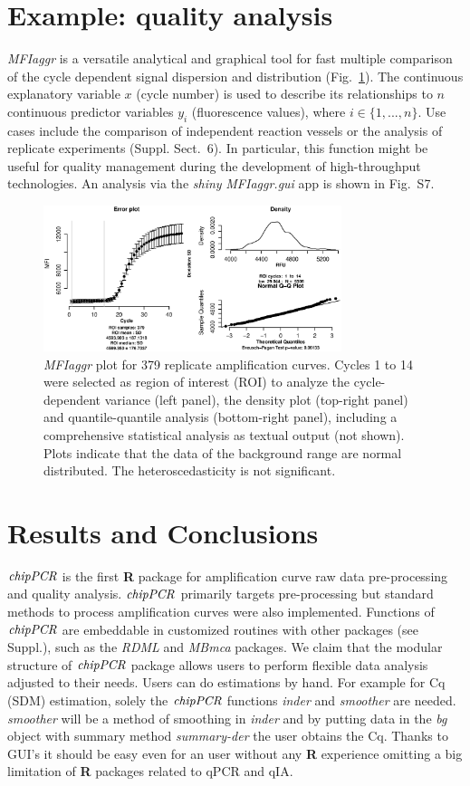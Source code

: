 \documentclass{bioinfo}
\begin{document}
\section{Example: quality analysis}

\textsl{MFIaggr} is a versatile analytical and graphical tool for fast multiple 
comparison of the cycle dependent signal dispersion and distribution 
(Fig.~\ref{fig:01}). The continuous explanatory variable $x$ (cycle number) is 
used to describe its relationships to $n$ continuous predictor variables $y_i$ 
(fluorescence values), where $i \in \{1, ..., n\}$. Use cases include the 
comparison of independent reaction vessels or the analysis of replicate 
experiments (Suppl. Sect.~6). In particular, this function might be useful for 
quality management during the development of high-throughput technologies. An 
analysis via the \emph{shiny} \textsl{MFIaggr.gui} app is shown in Fig.~S7.

\begin{figure}[!tpb]%
\centerline{\includegraphics[width=8.7cm]{fig01.eps}}
\caption{\textsl{MFIaggr} plot for 379 replicate amplification curves. Cycles 1 to 14 were 
selected as region of interest (ROI) to analyze the 
cycle-dependent variance (left panel), the density plot (top-right 
panel) and quantile-quantile analysis (bottom-right panel), including a 
comprehensive statistical analysis as textual output (not shown). Plots 
indicate that the data of the background range are normal 
distributed. The heteroscedasticity is not significant.}\label{fig:01}
\end{figure}
\section{Results and Conclusions}

$\emph{chipPCR}$ is the first \textbf{R} package for amplification curve raw 
data pre-processing and quality analysis. $\emph{chipPCR}$ primarily targets 
pre-processing but standard methods to process amplification curves were also 
implemented. Functions of $\emph{chipPCR}$ are embeddable in customized routines 
with other packages (see Suppl.), such as the \emph{RDML} and \emph{MBmca} 
packages. We claim that the 
modular structure of $\emph{chipPCR}$ package allows users to perform flexible 
data analysis adjusted to their needs. Users can do estimations by hand. For 
example for Cq (SDM) estimation, solely the $\emph{chipPCR}$ functions 
\textsl{inder} and \textsl{smoother} are needed. \textsl{smoother} will be a 
method of smoothing in \textsl{inder} and by putting data in the \textsl{bg} 
object with summary method \textsl{summary-der} the user obtains the Cq. Thanks 
to GUI's it should be easy even for an user without any \textbf{R} experience 
omitting a big limitation of \textbf{R} packages related to qPCR and qIA.
\end{document}

